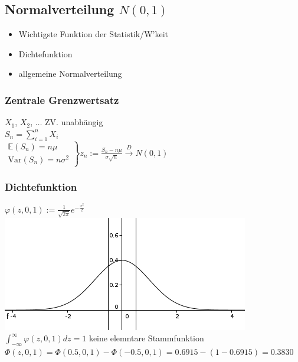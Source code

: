 \documentclass[a4paper,10pt]{article}
\newcommand{\EN}{\mathbb{E}}
\newcommand{\T}[1]{\text{#1}} %
\newcommand{\Brackar}[2]{\left.\begin{array}{#1} #2 \end{array}\right\rbrace} %
\newcommand{\Sumone}[2]{\sum_{#2=1}^{#1}} %
\newcommand{\Oneover}[1]{\frac{1}{#1}} %
\newcommand{\Oben}[2]{\overset{#1}{#2}} %
\begin{document}
\subsection{Normalverteilung $N(0,1)$}
\begin{itemize}
 \item Wichtigste Funktion der Statistik/W'keit
 \item Dichtefunktion
 \item allgemeine Normalverteilung
\end{itemize}
\subsubsection{Zentrale Grenzwertsatz}
$X_1$, $X_2$, $\dots$ ZV. unabhängig\\
$S_n=\Sumone{n}{i}X_i$\\
$\Brackar{r}{\EN(S_n)=n\mu\\\T{Var}(S_n)=n\sigma^2}z_n:=\frac{S_n-n\mu}{\sigma\sqrt{n}}\Oben{D}{\to}N(0,1)$
\subsubsection{Dichtefunktion}
$\varphi(z,0,1):=\Oneover{\sqrt{2\pi}}e^{-\frac{x^2}{2}}$\\
\includegraphics{Pic4.png}\\
$\int_{-\infty}^{\infty}\varphi(z,0,1)dz=1$ keine elemntare Stammfunktion\\
$\varPhi(z,0,1)=\varPhi(0.5,0,1)-\varPhi(-0.5,0,1)=0.6915-(1-0.6915)=0.3830$
\end{document}
